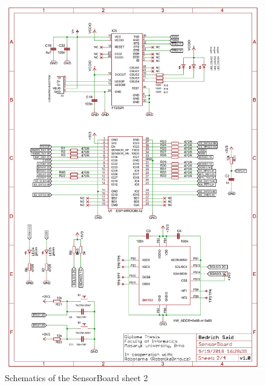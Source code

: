 \begin{figure}
	\centering
	\includegraphics[width=\linewidth]{img/sch2.pdf}
	\caption{Schematics of the SensorBoard sheet 2}
	\label{sch2}
\end{figure}

